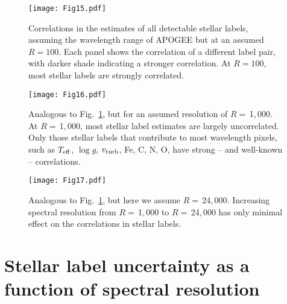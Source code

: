 \documentclass[iop]{emulateapj}
\begin{document}
\begin{CJK*}{UTF8}{gbsn}
\begin{figure*}
\centering
\vspace{1.5cm}
\texttt{[image: Fig15.pdf]}
\caption{Correlations in the estimates of all detectable stellar labels, assuming the wavelength range of APOGEE but at an assumed $R=100$. Each panel shows the correlation of a different label pair, with darker shade indicating a stronger correlation. At $R=100$, most stellar labels are strongly correlated.}
\label{fig:no-correlation-1}
\vspace{5cm}
\end{figure*}

\begin{figure*}
\centering
\vspace{1.5cm}
\texttt{[image: Fig16.pdf]}
\caption{Analogous to Fig.~\ref{fig:no-correlation-1}, but for an assumed resolution of $R = \,$1$,$000. At $R = \,$1$,$000, most stellar label estimates are largely uncorrelated. Only those stellar labels that contribute to most wavelength pixels, such as $T_{\rm eff}$, $\log g$, $v_{\rm turb}$, Fe, C, N, O, have strong -- and well-known -- correlations.}
\label{fig:no-correlation-2}
\vspace{5cm}
\end{figure*}

\begin{figure*}
\centering
\vspace{1.5cm}
\texttt{[image: Fig17.pdf]}
\caption{Analogous to Fig.~\ref{fig:no-correlation-1}, but here we assume $R = \,$24$,$000. Increasing spectral resolution from $R = \,$1$,$000 to $R = \,$24$,$000 has only minimal effect on the correlations in stellar labels.}
\label{fig:no-correlation-4}
\vspace{5cm}
\end{figure*}


%
%
%
%
%
%

\section{Stellar label uncertainty as a function of spectral resolution}
\label{sec:absolute-uncertainties}


\end{CJK*}
\end{document}
